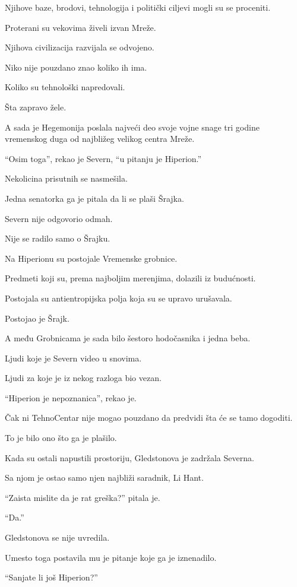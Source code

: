 Njihove baze, brodovi, tehnologija i politički ciljevi mogli su se proceniti.

Proterani su vekovima živeli izvan Mreže.

Njihova civilizacija razvijala se odvojeno.

Niko nije pouzdano znao koliko ih ima.

Koliko su tehnološki napredovali.

Šta zapravo žele.

A sada je Hegemonija poslala najveći deo svoje vojne snage tri godine vremenskog duga od najbližeg velikog centra Mreže.

``Osim toga'', rekao je Severn, ``u pitanju je Hiperion.''

Nekolicina prisutnih se nasmešila.

Jedna senatorka ga je pitala da li se plaši Šrajka.

Severn nije odgovorio odmah.

Nije se radilo samo o Šrajku.

Na Hiperionu su postojale Vremenske grobnice.

Predmeti koji su, prema najboljim merenjima, dolazili iz budućnosti.

Postojala su antientropijska polja koja su se upravo urušavala.

Postojao je Šrajk.

A među Grobnicama je sada bilo šestoro hodočasnika i jedna beba.

Ljudi koje je Severn video u snovima.

Ljudi za koje je iz nekog razloga bio vezan.

``Hiperion je nepoznanica'', rekao je.

Čak ni TehnoCentar nije mogao pouzdano da predvidi šta će se tamo dogoditi.

To je bilo ono što ga je plašilo.

\bigskip

Kada su ostali napustili prostoriju, Gledstonova je zadržala Severna.

Sa njom je ostao samo njen najbliži saradnik, Li Hant.

``Zaista mislite da je rat greška?'' pitala je.

``Da.''

Gledstonova se nije uvredila.

Umesto toga postavila mu je pitanje koje ga je iznenadilo.

``Sanjate li još Hiperion?''

